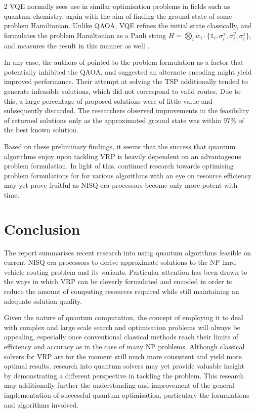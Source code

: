 \documentclass [10pt]{article}
\begin{document}
\begin {multicols}{2}
VQE normally sees use in similar optimisation problems in fields such as
quantum chemistry, again with the aim of finding the ground state of some
problem Hamiltonian. Unlike QAOA, VQE refines the initial state classically,
and formulates the problem Hamiltonian as a Pauli string $H = \bigotimes_i w_i
\cdot \{\mathbb{1}_i, \sigma^x_i, \sigma^y_i, \sigma^z_i\}$, and measures the
result in this manner as well \cite{vqe}.

In any case, the authors of \cite{cvrpqaoa} pointed to the problem formulation
as a factor that potentially inhibited the QAOA, and suggested an alternate
encoding might yield improved performance. Their attempt at solving the TSP
additionally tended to generate infeasible solutions, which did not correspond
to valid routes. Due to this, a large percentage of proposed solutions were of
little value and subsequently discarded. The researchers observed improvements
in the feasibility of returned solutions only as the approximated ground state
was within 97\% of the best known solution.

Based on these preliminary findings, it seems that the success that quantum
algorithms enjoy upon tackling VRP is heavily dependent on an advantageous
problem formulation. In light of this, continued research towards optimising
problem formulations for for various algorithms with an eye on resource
efficiency may yet prove fruitful as NISQ era processors become only more
potent with time.

\section {Conclusion}
The report summarises recent research into using quantum algorithms 
feasible on current NISQ era processors to derive approximate solutions to the
NP hard vehicle routing problem and its variants. Particular attention has been
drawn to the ways in which VRP can be cleverly formulated and encoded in order
to reduce the amount of computing resources required while still maintaining
an adequate solution quality.

Given the nature of quantum computation, the concept of employing it to deal
with complex and large scale search and optimisation problems will always be
appealing, especially once conventional classical methods reach their limits
of efficiency and accuracy as in the case of many NP problems. Although
classical solvers for VRP are for the moment still much more consistent and
yield more optimal results, research into quantum solvers may
yet provide valuable insight by demonstrating a different perspective in
tackling the problem. This research may additionally further the understanding
and improvement of the general implementation of successful quantum
optimisation, particulary the formulations and algorithms involved.


\end{multicols}
\end{document}
